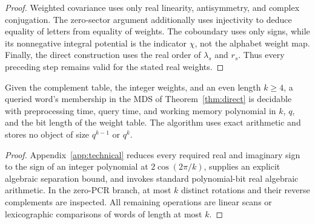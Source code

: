 \begin{proof}
Weighted covariance uses only real linearity, antisymmetry, and complex
conjugation.  The zero-sector argument additionally uses injectivity to
deduce equality of letters from equality of weights.  The coboundary uses
only signs, while its nonnegative integral potential is the indicator
$\chi$, not the alphabet weight map.  Finally, the direct construction uses
the real order of $\lambda_s$ and $r_s$.  Thus every preceding step remains
valid for the stated real weights.
\end{proof}

\begin{corollary}
\label{cor:complexity}
Given the complement table, the integer weights, and an even length $k\geq4$, a
queried word's membership in the MDS of Theorem~\ref{thm:direct} is decidable
with preprocessing time, query time, and working memory polynomial in $k$,
$q$, and the bit length of the weight table.  The algorithm uses exact
arithmetic and stores no object of size $q^{k-1}$ or $q^k$.
\end{corollary}

\begin{proof}
Appendix~\ref{app:technical} reduces every required real and imaginary sign
to the sign of an integer polynomial at $2\cos(2\pi/k)$, supplies an explicit
algebraic separation bound, and invokes standard polynomial-bit real
algebraic arithmetic.  In the zero-PCR branch, at most $k$ distinct rotations
and their reverse complements are inspected.  All remaining operations are
linear scans or lexicographic comparisons of words of length at most $k$.
\end{proof}
